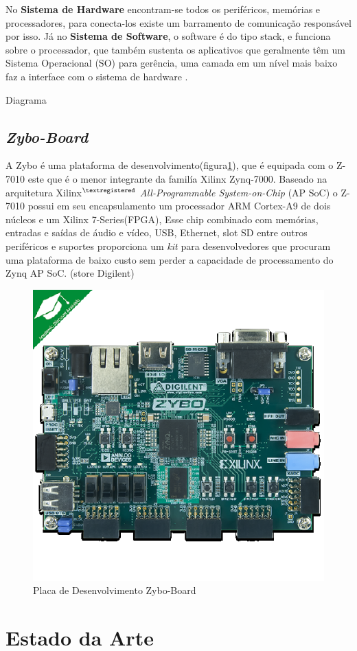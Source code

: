 No \textbf{Sistema de Hardware}
encontram-se todos os periféricos,
memórias e processadores, para conecta-los
existe um barramento de comunicação
responsável por isso.
Já no \textbf{Sistema de Software}, o software é do tipo stack, e funciona sobre o
processador, que também sustenta os aplicativos que geralmente têm um
Sistema Operacional (SO) para gerência, uma camada em um nível mais baixo
faz a interface com o sistema de hardware \cite{zynqBook}.

 Diagrama
\subsection{\textit{Zybo-Board}}
A Zybo é uma plataforma de desenvolvimento(figura\ref{Zybo Board}), que é equipada com o Z-7010
este que é  o menor integrante da familía Xilinx Zynq-7000.
Baseado na arquitetura Xilinx$^{\textregistered}$ \textit{All-Programmable System-on-Chip} (AP SoC)
o Z-7010 possui em seu encapsulamento um processador ARM Cortex-A9 de 
dois núcleos e um Xilinx 7-Series(FPGA), Esse chip combinado com memórias, entradas 
e saídas de áudio e vídeo, USB, Ethernet, slot SD entre outros periféricos e suportes
proporciona um \textit{kit} para desenvolvedores que procuram uma plataforma de baixo custo
sem perder a capacidade de processamento do Zynq AP SoC. (store Digilent)  

\begin{figure}[h]
	\centering
	\includegraphics[keepaspectratio=true,scale=1.0]{figuras/zyboboard.eps}
	\caption{Placa de Desenvolvimento Zybo-Board}
	\label{Zybo Board}
\end{figure}



\section{Estado da Arte}



